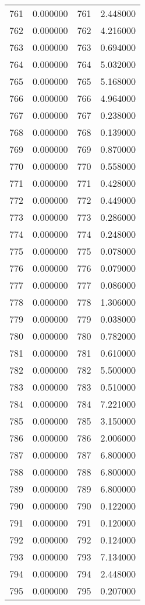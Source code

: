 \documentclass[12pt]{article}
\begin{document}
\begin{longtable}{@{}cccc@{}}
761 & 0.000000 & 761 & 2.448000 \\
762 & 0.000000 & 762 & 4.216000 \\
763 & 0.000000 & 763 & 0.694000 \\
764 & 0.000000 & 764 & 5.032000 \\
765 & 0.000000 & 765 & 5.168000 \\
766 & 0.000000 & 766 & 4.964000 \\
767 & 0.000000 & 767 & 0.238000 \\
768 & 0.000000 & 768 & 0.139000 \\
769 & 0.000000 & 769 & 0.870000 \\
770 & 0.000000 & 770 & 0.558000 \\
771 & 0.000000 & 771 & 0.428000 \\
772 & 0.000000 & 772 & 0.449000 \\
773 & 0.000000 & 773 & 0.286000 \\
774 & 0.000000 & 774 & 0.248000 \\
775 & 0.000000 & 775 & 0.078000 \\
776 & 0.000000 & 776 & 0.079000 \\
777 & 0.000000 & 777 & 0.086000 \\
778 & 0.000000 & 778 & 1.306000 \\
779 & 0.000000 & 779 & 0.038000 \\
780 & 0.000000 & 780 & 0.782000 \\
781 & 0.000000 & 781 & 0.610000 \\
782 & 0.000000 & 782 & 5.500000 \\
783 & 0.000000 & 783 & 0.510000 \\
784 & 0.000000 & 784 & 7.221000 \\
785 & 0.000000 & 785 & 3.150000 \\
786 & 0.000000 & 786 & 2.006000 \\
787 & 0.000000 & 787 & 6.800000 \\
788 & 0.000000 & 788 & 6.800000 \\
789 & 0.000000 & 789 & 6.800000 \\
790 & 0.000000 & 790 & 0.122000 \\
791 & 0.000000 & 791 & 0.120000 \\
792 & 0.000000 & 792 & 0.124000 \\
793 & 0.000000 & 793 & 7.134000 \\
794 & 0.000000 & 794 & 2.448000 \\
795 & 0.000000 & 795 & 0.207000 \\

\end{longtable}
\end{document}
